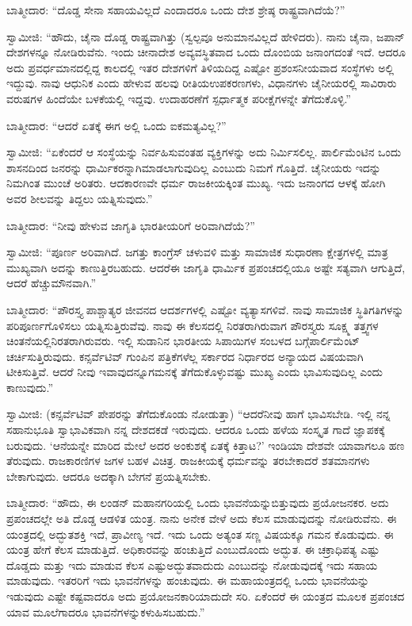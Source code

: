 ಬಾತ್ಮೀದಾರ: “ದೊಡ್ಡ ಸೇನಾ ಸಹಾಯವಿಲ್ಲದೆ ಎಂದಾದರೂ ಒಂದು ದೇಶ ಶ್ರೇಷ್ಠ ರಾಷ್ಟ್ರವಾಗಿದೆಯೆ?”

ಸ್ವಾಮೀಜಿ: “ಹೌದು, ಚೈನಾ ದೊಡ್ಡ ರಾಷ್ಟ್ರವಾಗಿತ್ತು (ಸ್ವಲ್ಪವೂ ಅನುಮಾನವಿಲ್ಲದೆ ಹೇಳಿದರು). ನಾನು ಚೈನಾ, ಜಪಾನ್​ ದೇಶಗಳನ್ನೂ ನೋಡಿರುವೆನು. ಇಂದು ಚೀನಾದೇಶ ಅವ್ಯವಸ್ಥಿತವಾದ ಒಂದು ದೊಂಬಿಯ ಜನಾಂಗದಂತೆ ಇದೆ. ಆದರೂ ಅದು ಪ್ರವರ್ಧಮಾನದಲ್ಲಿದ್ದ ಕಾಲದಲ್ಲಿ ಇತರ ದೇಶಗಳಿಗೆ ತಿಳಿಯದಿದ್ದ ಎಷ್ಟೋ ಪ್ರಶಂಸನೀಯ\-ವಾದ ಸಂಸ್ಥೆಗಳು ಅಲ್ಲಿ ಇದ್ದುವು. ನಾವು ಆಧುನಿಕ ಎಂದು ಹೇಳುವ ಹಲವು ರೀತಿಯ\break ಉಪಕರಣಗಳು, ವಿಧಾನಗಳು ಚೈನೀಯರಲ್ಲಿ ಸಾವಿರಾರು ವರುಷಗಳ ಹಿಂದೆಯೇ ಬಳಕೆಯಲ್ಲಿ ಇದ್ದವು. ಉದಾಹರಣೆಗೆ ಸ್ಪರ್ಧಾತ್ಮಕ ಪರೀಕ್ಷೆಗಳನ್ನೇ ತೆಗೆದುಕೊಳ್ಳಿ.”

ಬಾತ್ಮೀದಾರ: “ಆದರೆ ಏತಕ್ಕೆ ಈಗ ಅಲ್ಲಿ ಒಂದು ಐಕಮತ್ಯವಿಲ್ಲ?”

ಸ್ವಾಮೀಜಿ: “ಏಕೆಂದರೆ ಆ ಸಂಸ್ಥೆಯನ್ನು ನಿರ್ವಹಿಸುವಂತಹ ವ್ಯಕ್ತಿಗಳನ್ನು ಅದು ನಿರ್ಮಿಸಲಿಲ್ಲ. ಪಾರ್ಲಿಮೆಂಟಿನ ಒಂದು ಶಾಸನದಿಂದ ಜನರನ್ನು ಧಾರ್ಮಿಕರನ್ನಾಗಿ\break ಮಾಡಲಾಗುವುದಿಲ್ಲ ಎಂಬುದು ನಿಮಗೆ ಗೊತ್ತಿದೆ. ಚೈನೀಯರು ಇದನ್ನು ನಿಮಗಿಂತ ಮುಂಚೆ ಅರಿತರು. ಆದಕಾರಣವೇ ಧರ್ಮ ರಾಜಕೀಯಕ್ಕಿಂತ ಮುಖ್ಯ. ಇದು ಜನಾಂಗದ ಆಳಕ್ಕೆ ಹೋಗಿ ಅವರ ಶೀಲವನ್ನು ತಿದ್ದಲು ಯತ್ನಿಸುವುದು.”

ಬಾತ್ಮೀದಾರ: “ನೀವು ಹೇಳುವ ಜಾಗೃತಿ ಭಾರತೀಯರಿಗೆ ಅರಿವಾಗಿದೆಯೆ?”

ಸ್ವಾಮೀಜಿ: “ಪೂರ್ಣ ಅರಿವಾಗಿದೆ. ಜಗತ್ತು ಕಾಂಗ್ರೆಸ್​ ಚಳುವಳಿ ಮತ್ತು ಸಾಮಾಜಿಕ ಸುಧಾರಣಾ ಕ್ಷೇತ್ರಗಳಲ್ಲಿ ಮಾತ್ರ ಮುಖ್ಯವಾಗಿ ಅದನ್ನು ಕಾಣುತ್ತಿರಬಹುದು. ಆದರೆ\break ಈ ಜಾಗೃತಿ ಧಾರ್ಮಿಕ ಪ್ರಪಂಚದಲ್ಲಿಯೂ ಅಷ್ಟೇ ಸತ್ಯವಾಗಿ ಆಗುತ್ತಿದೆ, ಆದರೆ ಹೆಚ್ಚು\break ಮೌನವಾಗಿ.”

ಬಾತ್ಮೀದಾರ: “ಪೌರಸ್ತ್ಯ ಪಾಶ್ಚಾತ್ಯರ ಜೀವನದ ಆದರ್ಶಗಳಲ್ಲಿ ಎಷ್ಟೋ ವ್ಯತ್ಯಾಸಗಳಿವೆ. ನಾವು ಸಾಮಾಜಿಕ ಸ್ಥಿತಿಗತಿಗಳನ್ನು ಪರಿಪೂರ್ಣಗೊಳಿಸಲು ಯತ್ನಿಸುತ್ತಿರುವೆವು. ನಾವು ಈ ಕೆಲಸದಲ್ಲಿ ನಿರತರಾಗಿರುವಾಗ ಪೌರಸ್ತ್ಯರು ಸೂಕ್ಷ್ಮ ತತ್ತ್ವಗಳ ಚಿಂತನೆಯಲ್ಲಿ\break ನಿರತರಾಗಿರುವರು. ಇಲ್ಲಿ ಸುಡಾನಿನ ಭಾರತೀಯ ಸಿಪಾಯಿಗಳ ಸಂಬಳದ ಬಗ್ಗೆ\break ಪಾರ್ಲಿಮೆಂಟ್​ ಚರ್ಚಿಸುತ್ತಿರುವುದು. ಕನ್ಸರ್ವೆಟಿವ್​ ಗುಂಪಿನ ಪತ್ರಿಕೆಗಳೆಲ್ಲ ಸರ್ಕಾರದ ನಿರ್ಧಾರದ ಅನ್ಯಾಯದ ವಿಷಯವಾಗಿ ಟೀಕಿಸುತ್ತಿವೆ. ಆದರೆ ನೀವು ಇವಾವುದನ್ನೂ\break ಗಮನಕ್ಕೆ ತೆಗೆದುಕೊಳ್ಳುವಷ್ಟು ಮುಖ್ಯ ಎಂದು ಭಾವಿಸುವುದಿಲ್ಲ ಎಂದು ಕಾಣುವುದು.”

ಸ್ವಾಮೀಜಿ: (ಕನ್ಸರ್ವೆಟಿವ್​ ಪೇಪರನ್ನು ತೆಗೆದುಕೊಂಡು ನೋಡುತ್ತಾ) “ಆದರೆ\break ನೀವು ಹಾಗೆ ಭಾವಿಸಬೇಡಿ. ಇಲ್ಲಿ ನನ್ನ ಸಹಾನುಭೂತಿ ಸ್ವಾಭಾವಿಕವಾಗಿ ನನ್ನ ದೇಶದ\break ಕಡೆ ಇರುವುದು. ಆದರೂ ಒಂದು ಹಳೆಯ ಸಂಸ್ಕೃತ ಗಾದೆ ಜ್ಞಾಪಕಕ್ಕೆ ಬರುವುದು. ‘ಆನೆಯನ್ನೇ ಮಾರಿದ ಮೇಲೆ ಅದರ ಅಂಕುಶಕ್ಕೆ ಏತಕ್ಕೆ ಕಿತ್ತಾಟ?’ ಇಂಡಿಯಾ ದೇಶವೇ ಯಾವಾಗಲೂ ಹಣ ತೆರುವುದು. ರಾಜಕಾರಣಿಗಳ ಜಗಳ ಬಹಳ ವಿಚಿತ್ರ. ರಾಜಕೀಯಕ್ಕೆ ಧರ್ಮವನ್ನು ತರಬೇಕಾದರೆ ಶತಮಾನಗಳು ಬೇಕಾಗುವುದು. ಆದರೂ ಅದಕ್ಕಾಗಿ ಬೇಗನೆ ಪ್ರಯತ್ನಿಸಬೇಕು.

ಬಾತ್ಮೀದಾರ: “ಹೌದು, ಈ ಲಂಡನ್​ ಮಹಾನಗರಿಯಲ್ಲಿ ಒಂದು ಭಾವನೆಯನ್ನು\break ಬಿತ್ತುವುದು ಪ್ರಯೋಜನಕರ. ಅದು ಪ್ರಪಂಚದಲ್ಲೇ ಅತಿ ದೊಡ್ಡ ಆಡಳಿತ ಯಂತ್ರ. ನಾನು ಅನೇಕ ವೇಳೆ ಅದು ಕೆಲಸ ಮಾಡುವುದನ್ನು ನೋಡಿರುವೆನು. ಈ ಯಂತ್ರದಲ್ಲಿ ಅದ್ಭುತ\break ಶಕ್ತಿ ಇದೆ, ಪ್ರಾವೀಣ್ಯ ಇದೆ. ಇದು ಒಂದು ಅತ್ಯಂತ ಸಣ್ಣ ವಿಷಯಕ್ಕೂ ಗಮನ ಕೊಡುವುದು. ಈ ಯಂತ್ರ ಹೇಗೆ ಕೆಲಸ ಮಾಡುತ್ತಿದೆ. ಅಧಿಕಾರವನ್ನು ಹಂಚುತ್ತಿದೆ ಎಂಬುದೊಂದು ಅದ್ಭುತ. ಈ ಚಕ್ರಾಧಿಪತ್ಯ ಎಷ್ಟು ದೊಡ್ಡದು ಮತ್ತು ಇದು ಮಾಡುವ ಕೆಲಸ ಎಷ್ಟು\break ಅದ್ಭುತವಾದುದು ಎಂಬುದನ್ನು ನೋಡುವುದಕ್ಕೆ ಇದು ಸಹಾಯ ಮಾಡುವುದು. ಇತರರಿಗೆ ಇದು ಭಾವನೆಗಳನ್ನು ಹಂಚುವುದು. ಈ ಮಹಾಯಂತ್ರದಲ್ಲಿ ಒಂದು ಭಾವನೆಯನ್ನು ಇಡುವುದು ಎಷ್ಟೇ ಕಷ್ಟವಾದರೂ ಅದು ಪ್ರಯೋಜನಕಾರಿಯಾದುದೇ ಸರಿ. ಏಕೆಂದರೆ ಈ ಯಂತ್ರದ ಮೂಲಕ ಪ್ರಪಂಚದ ಯಾವ ಮೂಲೆಗಾದರೂ ಭಾವನೆಗಳನ್ನು\break ಕಳುಹಿಸಬಹುದು.”

